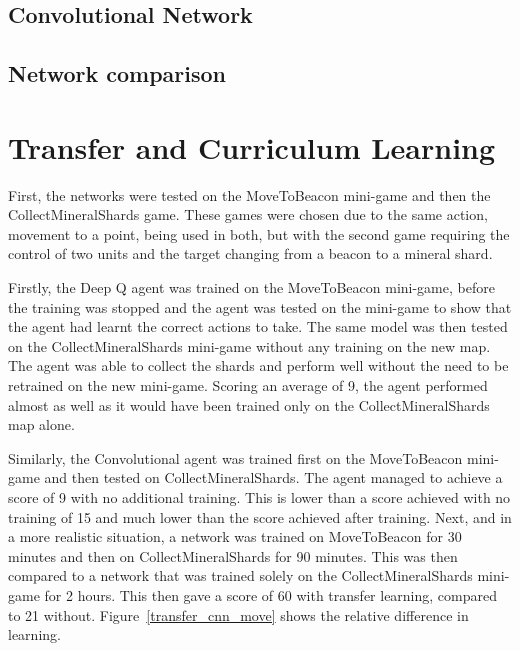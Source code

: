 \subsection{Convolutional Network}

\subsection{Network comparison}


\section{Transfer and Curriculum Learning}

First, the networks were tested on the MoveToBeacon mini-game and then the
CollectMineralShards game. These games were chosen due to the same action,
movement to a point, being used in both, but with the second game requiring the
control of two units and the target changing from a beacon to a mineral shard.

Firstly, the Deep Q agent was trained on the MoveToBeacon mini-game, before the
training was stopped and the agent was tested on the mini-game to show that the
agent had learnt the correct actions to take. The same model was then tested on
the CollectMineralShards mini-game without any training on the new map. The
agent was able to collect the shards and perform well without the need to be
retrained on the new mini-game. Scoring an average of 9, the agent performed
almost as well as it would have been trained only on the CollectMineralShards
map alone.

Similarly, the Convolutional agent was trained first on the MoveToBeacon
mini-game and then tested on CollectMineralShards. The agent managed to achieve
a score of 9 with no additional training. This is lower than a score achieved
with no training of 15 and much lower than the score achieved after training.
Next, and in a more realistic situation, a network was trained on MoveToBeacon
for 30 minutes and then on CollectMineralShards for 90 minutes. This was then
compared to a network that was trained solely on the CollectMineralShards
mini-game for 2 hours. This then gave a score of 60 with transfer learning,
compared to 21 without. Figure~\ref{transfer_cnn_move} shows the relative
difference in learning.

